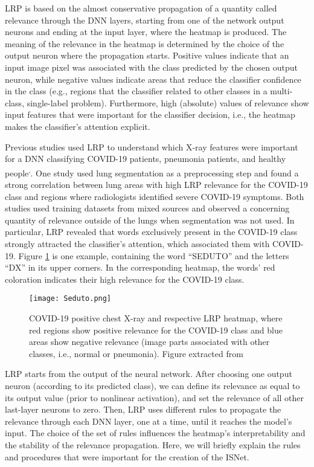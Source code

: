 \documentclass[fleqn,10pt]{wlscirep}
\begin{document}
{LRP is based on the almost conservative propagation of a quantity called relevance through the DNN layers, starting from one of the network output neurons and ending at the input layer, where the heatmap is produced. The meaning of the relevance in the heatmap is determined by the choice of the output neuron where the propagation starts. Positive values indicate that an input image pixel was associated with the class predicted by the chosen output neuron, while negative values indicate areas that reduce the classifier confidence in the class (e.g., regions that the classifier related to other classes in a multi-class, single-label problem). Furthermore, high (absolute) values of relevance show input features that were important for the classifier decision, i.e., the heatmap makes the classifier's attention explicit. 

Previous studies used LRP to understand which X-ray features were important for a DNN classifying COVID-19 patients, pneumonia patients, and healthy people\cite{bassi2021covid19}\textsuperscript{,}\cite{FirstPaperCovid}. One study used lung segmentation as a preprocessing step and found a strong correlation between lung areas with high LRP relevance for the COVID-19 class and regions where radiologists identified severe COVID-19 symptoms\cite{bassi2021covid19}. Both studies used training datasets from mixed sources and observed a concerning quantity of relevance outside of the lungs when segmentation was not used. In particular, LRP revealed that words exclusively present in the COVID-19 class strongly attracted the classifier's attention, which associated them with COVID-19. Figure \ref{seduto} is one example, containing the word ``SEDUTO'' and the letters ``DX'' in its upper corners. In the corresponding heatmap, the words' red coloration indicates their high relevance for the COVID-19 class. 

\begin{figure}[h]
\texttt{[image: Seduto.png]}
\centering
\caption{COVID-19 positive chest X-ray and respective LRP heatmap, where red regions show positive relevance for the COVID-19 class and blue areas show negative relevance (image parts associated with other classes, i.e., normal or pneumonia). Figure extracted from\cite{bassi2021covid19}}
\label{seduto}
\end{figure}

LRP starts from the output of the neural network. After choosing one output neuron (according to its predicted class), we can define its relevance as equal to its output value (prior to nonlinear activation), and set the relevance of all other last-layer neurons to zero. Then, LRP uses different rules to propagate the relevance through each DNN layer, one at a time, until it reaches the model's input. The choice of the set of rules influences the heatmap's interpretability and the stability of the relevance propagation\cite{LRPBook}. Here, we will briefly explain the rules and procedures that were important for the creation of the ISNet.

}
\end{document}
